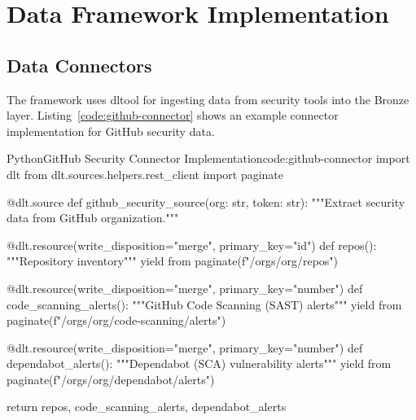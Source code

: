 \chapter{Data Framework Implementation}
\label{ch:framework-implementation}

\section{Data Connectors}

The framework uses \gls{dltool} for ingesting data from security tools into the Bronze layer. Listing~\ref{code:github-connector} shows an example connector implementation for GitHub security data.

\begin{code}{Python}{GitHub Security Connector Implementation}{code:github-connector}
import dlt
from dlt.sources.helpers.rest_client import paginate

@dlt.source
def github_security_source(org: str, token: str):
    """Extract security data from GitHub organization."""

    @dlt.resource(write_disposition="merge", primary_key="id")
    def repos():
        """Repository inventory"""
        yield from paginate(f"/orgs/{org}/repos")

    @dlt.resource(write_disposition="merge", primary_key="number")
    def code_scanning_alerts():
        """GitHub Code Scanning (SAST) alerts"""
        yield from paginate(f"/orgs/{org}/code-scanning/alerts")

    @dlt.resource(write_disposition="merge", primary_key="number")
    def dependabot_alerts():
        """Dependabot (SCA) vulnerability alerts"""
        yield from paginate(f"/orgs/{org}/dependabot/alerts")

    return repos, code_scanning_alerts, dependabot_alerts
\end{code}